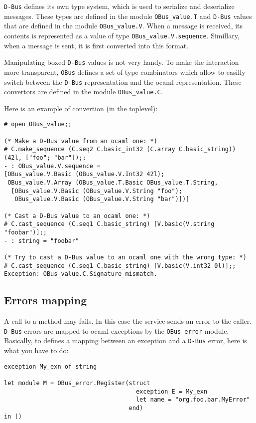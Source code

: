 \documentclass{article}
\newcommand{\obus}{\texttt{OBus}\xspace}
\newcommand{\dbus}{\texttt{D-Bus}\xspace}
\begin{document}
\dbus defines its own type system, which is used to serialize and
deserialize messages. These types are defined in the module
\texttt{OBus\_value.T} and \dbus values that are defined in the module
\texttt{OBus\_value.V}. When a message is received, its contents is
represented as a value of type \texttt{OBus\_value.V.sequence}.
Simillary, when a message is sent, it is first converted into this
format.

Manipulating boxed \dbus values is not very handy. To make the
interaction more transparent, \obus defines a set of type combinators
which allow to easilly switch between the \dbus representation and the
ocaml representation. These convertors are defined in the module
\texttt{OBus\_value.C}.

Here is an example of convertion (in the toplevel):

\lstset{language=[Objective]Caml}
\begin{lstlisting}
# open OBus_value;;

(* Make a D-Bus value from an ocaml one: *)
# C.make_sequence (C.seq2 C.basic_int32 (C.array C.basic_string)) (42l, ["foo"; "bar"]);;
- : OBus_value.V.sequence =
[OBus_value.V.Basic (OBus_value.V.Int32 42l);
 OBus_value.V.Array (OBus_value.T.Basic OBus_value.T.String,
  [OBus_value.V.Basic (OBus_value.V.String "foo");
   OBus_value.V.Basic (OBus_value.V.String "bar")])]

(* Cast a D-Bus value to an ocaml one: *)
# C.cast_sequence (C.seq1 C.basic_string) [V.basic(V.string "foobar")];;
- : string = "foobar"

(* Try to cast a D-Bus value to an ocaml one with the wrong type: *)
# C.cast_sequence (C.seq1 C.basic_string) [V.basic(V.int32 0l)];;
Exception: OBus_value.C.Signature_mismatch.
\end{lstlisting}

\subsection{Errors mapping}

A call to a method may fails. In this case the service sends an error
to the caller.  \dbus errors are mapped to ocaml exceptions by the
\texttt{OBus\_error} module.  Basically, to defines a mapping between
an exception and a \dbus error, here is what you have to do:

\lstset{language=[Objective]Caml}
\begin{lstlisting}
exception My_exn of string

let module M = OBus_error.Register(struct
                                     exception E = My_exn
                                     let name = "org.foo.bar.MyError"
                                   end)
in ()
\end{lstlisting}
\end{document}
